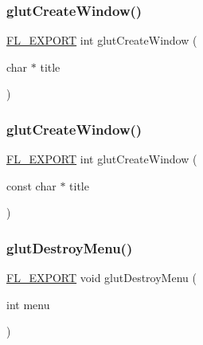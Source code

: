 \mbox{\label{glut_8_h_a9b4aada0042db3918e9d2c2e25e46d3b}} 
\subsubsection{\texorpdfstring{glut\+Create\+Window()}{glutCreateWindow()}\hspace{0.1cm}{\footnotesize\ttfamily [1/2]}}
{\footnotesize\ttfamily \hyperlink{_fl___export_8_h_aa9ba29a18aee9d738370a06eeb4470fc}{F\+L\+\_\+\+E\+X\+P\+O\+RT} int glut\+Create\+Window (\begin{DoxyParamCaption}\item[{char $\ast$}]{title }\end{DoxyParamCaption})}

\mbox{\label{glut_8_h_aecebbf280e28385f509ac981d4adae78}} 
\subsubsection{\texorpdfstring{glut\+Create\+Window()}{glutCreateWindow()}\hspace{0.1cm}{\footnotesize\ttfamily [2/2]}}
{\footnotesize\ttfamily \hyperlink{_fl___export_8_h_aa9ba29a18aee9d738370a06eeb4470fc}{F\+L\+\_\+\+E\+X\+P\+O\+RT} int glut\+Create\+Window (\begin{DoxyParamCaption}\item[{const char $\ast$}]{title }\end{DoxyParamCaption})}

\mbox{\label{glut_8_h_a5dd13aa652b10b17e38cb2ac48ef6ec0}} 
\subsubsection{\texorpdfstring{glut\+Destroy\+Menu()}{glutDestroyMenu()}}
{\footnotesize\ttfamily \hyperlink{_fl___export_8_h_aa9ba29a18aee9d738370a06eeb4470fc}{F\+L\+\_\+\+E\+X\+P\+O\+RT} void glut\+Destroy\+Menu (\begin{DoxyParamCaption}\item[{int}]{menu }\end{DoxyParamCaption})}

